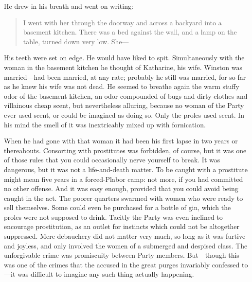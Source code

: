 He drew in his breath and went on writing:

\begin{quotation}
I went with her through the doorway and across a backyard into a
basement kitchen. There was a bed against the wall, and a lamp on the
table, turned down very low. She---
\end{quotation}

His teeth were set on edge. He would have liked to spit. Simultaneously
with the woman in the basement kitchen he thought of Katharine, his
wife. Winston was married---had been married, at any rate; probably he
still was married, for so far as he knew his wife was not dead. He
seemed to breathe again the warm stuffy odor of the basement kitchen, an
odor compounded of bugs and dirty clothes and villainous cheap scent,
but nevertheless alluring, because no woman of the Party ever used
scent, or could be imagined as doing so. Only the proles used scent. In
his mind the smell of it was inextricably mixed up with fornication.

When he had gone with that woman it had been his first lapse in two
years or thereabouts. Consorting with prostitutes was forbidden, of
course, but it was one of those rules that you could occasionally nerve
yourself to break. It was dangerous, but it was not a life-and-death
matter. To be caught with a prostitute might mean five years in a
forced-Plabor camp: not more, if you had committed no other offense. And
it was easy enough, provided that you could avoid being caught in the
act. The poorer quarters swarmed with women who were ready to sell
themselves. Some could even be purchased for a bottle of gin, which the
proles were not supposed to drink. Tacitly the Party was even inclined
to encourage prostitution, as an outlet for instincts which could not be
altogether suppressed. Mere debauchery did not matter very much, so long
as it was furtive and joyless, and only involved the women of a
submerged and despised class. The unforgivable crime was promiscuity
between Party members. But---though this was one of the crimes that the
accused in the great purges invariably confessed to---it was difficult
to imagine any such thing actually happening.


